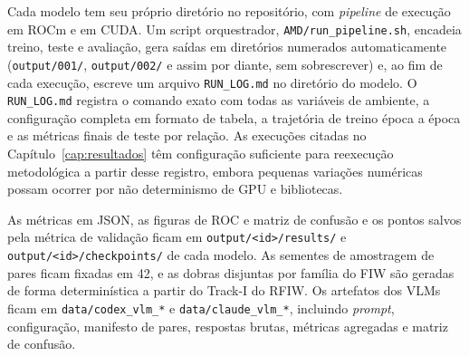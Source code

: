 Cada modelo tem seu próprio diretório no repositório, com \textit{pipeline} de execução em ROCm e em CUDA. Um script orquestrador, \texttt{AMD/run\_pipeline.sh}, encadeia treino, teste e avaliação, gera saídas em diretórios numerados automaticamente (\texttt{output/001/}, \texttt{output/002/} e assim por diante, sem sobrescrever) e, ao fim de cada execução, escreve um arquivo \texttt{RUN\_LOG.md} no diretório do modelo. O \texttt{RUN\_LOG.md} registra o comando exato com todas as variáveis de ambiente, a configuração completa em formato de tabela, a trajetória de treino época a época e as métricas finais de teste por relação. As execuções citadas no Capítulo~\ref{cap:resultados} têm configuração suficiente para reexecução metodológica a partir desse registro, embora pequenas variações numéricas possam ocorrer por não determinismo de GPU e bibliotecas.

As métricas em JSON, as figuras de ROC e matriz de confusão e os pontos salvos pela métrica de validação ficam em \texttt{output/<id>/results/} e \texttt{output/<id>/checkpoints/} de cada modelo. As sementes de amostragem de pares ficam fixadas em 42, e as dobras disjuntas por família do FIW são geradas de forma determinística a partir do Track-I do RFIW. Os artefatos dos VLMs ficam em \texttt{data/codex\_vlm\_*} e \texttt{data/claude\_vlm\_*}, incluindo \textit{prompt}, configuração, manifesto de pares, respostas brutas, métricas agregadas e matriz de confusão.
